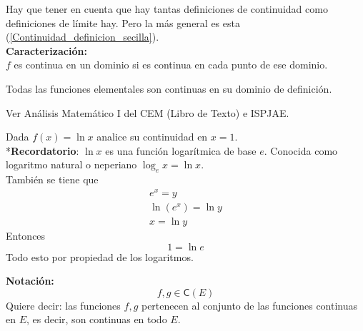 \documentclass[10pt,twoside]{SelfArx} %
\begin{document}
Hay que tener en cuenta que hay tantas definiciones de continuidad como definiciones de límite hay. Pero la m\'as general es esta (\ref{Continuidad_definicion_secilla}).\\
\textbf{Caracterización:}\\
$ f $ es continua en un dominio si es continua en cada punto de ese dominio.\\
\begin{propiedad}
	Todas las funciones elementales son continuas en su dominio de definición.\\	
\end{propiedad}
Ver Análisis Matemático I del CEM (Libro de Texto) e ISPJAE.\\

\begin{ejemplo}
	Dada $ f(x)= \ln x $ analice su continuidad en $ x=1 $.\\
	*\textbf{Recordatorio}: $ \ln x $ es una función logarítmica de base $ e $. Conocida como logaritmo natural o neperiano $ \log_{e}x =\ln x$.\\
	También se tiene que\\
\begin{eqnarray}
e^{x}=y\\
\ln (e^{x})=\ln y\\
x=\ln y
\end{eqnarray}
Entonces \[ 1=\ln e \]
Todo esto por propiedad de los logaritmos.\\

\end{ejemplo}


\textbf{Notación:}
\[ f,g\in\textsf{C}(E) \]
Quiere decir: las funciones $ f, g $ pertenecen al conjunto de las funciones continuas en $ E $, es decir, son continuas en todo $ E $.\\
\end{document}
